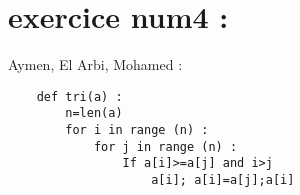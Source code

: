 \documentclass{article}
\begin{document}
\section{exercice num4 :}
	\begin{center}
    		Aymen, El Arbi, Mohamed :
	\end{center}
	\begin{lstlisting}
    def tri(a) :
        n=len(a)
        for i in range (n) :
            for j in range (n) :
                If a[i]>=a[j] and i>j
                    a[i]; a[i]=a[j];a[i]
	\end{lstlisting}
\end{document}
